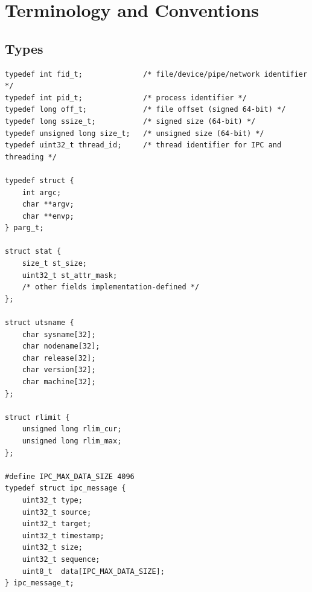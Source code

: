 \documentclass[12pt,a4paper]{article}
\begin{document}
\section{Terminology and Conventions}

\subsection{Types}
\begin{lstlisting}
typedef int fid_t;              /* file/device/pipe/network identifier */
typedef int pid_t;              /* process identifier */
typedef long off_t;             /* file offset (signed 64-bit) */
typedef long ssize_t;           /* signed size (64-bit) */
typedef unsigned long size_t;   /* unsigned size (64-bit) */
typedef uint32_t thread_id;     /* thread identifier for IPC and threading */

typedef struct {
    int argc;
    char **argv;
    char **envp;
} parg_t;

struct stat {
    size_t st_size;
    uint32_t st_attr_mask;
    /* other fields implementation-defined */
};

struct utsname {
    char sysname[32];
    char nodename[32];
    char release[32];
    char version[32];
    char machine[32];
};

struct rlimit {
    unsigned long rlim_cur;
    unsigned long rlim_max;
};

#define IPC_MAX_DATA_SIZE 4096
typedef struct ipc_message {
    uint32_t type;
    uint32_t source;
    uint32_t target;
    uint32_t timestamp;
    uint32_t size;
    uint32_t sequence;
    uint8_t  data[IPC_MAX_DATA_SIZE];
} ipc_message_t;
\end{lstlisting}
\end{document}
